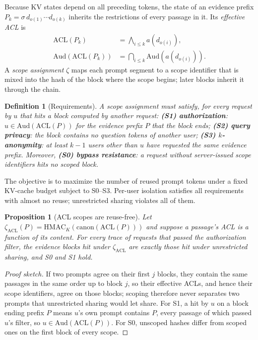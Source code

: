 \documentclass[11pt]{article}
\newcommand{\aud}{\mathrm{Aud}}
\newcommand{\acl}{\mathrm{ACL}}
\newtheorem{proposition}{Proposition}
\newtheorem{definition}{Definition}
\begin{document}
Because KV states depend on all preceding tokens, the state of an evidence prefix $P_k=\sigma\,d_{o(1)}\cdots d_{o(k)}$ inherits the restrictions of every passage in it. Its \emph{effective ACL} is
\begin{align}
\acl(P_k) &= \textstyle\bigwedge_{i\le k} a(d_{o(i)}),\\
\aud(\acl(P_k)) &= \textstyle\bigcap_{i\le k}\aud(a(d_{o(i)})).
\end{align}
A \emph{scope assignment} $\zeta$ maps each prompt segment to a scope identifier that is mixed into the hash of the block where the scope begins; later blocks inherit it through the chain.

\begin{definition}[Requirements]
A scope assignment must satisfy, for every request by $u$ that hits a block computed by another request:
\textbf{(S1) authorization}: $u\in\aud(\acl(P))$ for the evidence prefix $P$ that the block ends;
\textbf{(S2) query privacy}: the block contains no question tokens of another user;
\textbf{(S3) $k$-anonymity}: at least $k{-}1$ users other than $u$ have requested the same evidence prefix.
Moreover, \textbf{(S0) bypass resistance}: a request without server-issued scope identifiers hits no scoped block.
\end{definition}

\noindent The objective is to maximize the number of reused prompt tokens under a fixed KV-cache budget subject to S0--S3. Per-user isolation satisfies all requirements with almost no reuse; unrestricted sharing violates all of them.

\begin{proposition}[ACL scopes are reuse-free]
\label{prop:free}
Let $\zeta_{\acl}(P)=\mathrm{HMAC}_K(\mathrm{canon}(\acl(P)))$ and suppose a passage's ACL is a function of its content. For every trace of requests that passed the authorization filter, the evidence blocks hit under $\zeta_{\acl}$ are exactly those hit under unrestricted sharing, and S0 and S1 hold.
\end{proposition}
\begin{proof}[Proof sketch]
If two prompts agree on their first $j$ blocks, they contain the same passages in the same order up to block $j$, so their effective ACLs, and hence their scope identifiers, agree on those blocks; scoping therefore never separates two prompts that unrestricted sharing would let share. For S1, a hit by $u$ on a block ending prefix $P$ means $u$'s own prompt contains $P$, every passage of which passed $u$'s filter, so $u\in\aud(\acl(P))$. For S0, unscoped hashes differ from scoped ones on the first block of every scope.
\end{proof}
\end{document}

